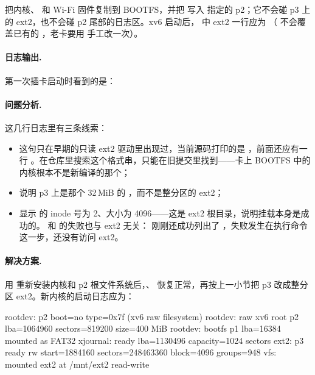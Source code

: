  把内核、 和 Wi-Fi 固件复制到 BOOTFS，并把  写入  指定的 p2；它不会碰 p3 上的 ext2，也不会碰 p2 尾部的日志区。xv6 启动后， 中 ext2 一行应为 （ 不会覆盖已有的 ，老卡要用  手工改一次）。

\paragraph{日志输出.} 第一次插卡启动时看到的是：


\paragraph{问题分析.} 这几行日志里有三条线索：

\begin{itemize}
  \item {} 这句只在早期的只读 ext2 驱动里出现过，当前源码打印的是 ，前面还应有一行 。在仓库里搜索这个格式串，只能在旧提交里找到——卡上 BOOTFS 中的内核根本不是新编译的那个；
  \item {} 说明 p3 上是那个 32\,MiB 的 ，而不是整分区的 ext2；
  \item {} 显示  的 inode 号为 2、大小为 4096——这是 ext2 根目录，说明挂载本身是成功的。 和  的失败也与 ext2 无关： 刚刚还成功列出了 ，失败发生在执行命令这一步，还没有访问 ext2。
\end{itemize}

\paragraph{解决方案.} 用  重新安装内核和 p2 根文件系统后，、 恢复正常，再按上一小节把 p3 改成整分区 ext2。新内核的启动日志应为：

\begin{txtcode}
rootdev: p2 boot=no type=0x7f (xv6 raw filesystem)
rootdev: raw xv6 root p2 lba=1064960 sectors=819200 size=400 MiB
rootdev: bootfs p1 lba=16384 mounted as FAT32
xjournal: ready lba=1130496 capacity=1024 sectors
ext2: p3 ready rw start=1884160 sectors=248463360 block=4096 groups=948
vfs: mounted ext2 at /mnt/ext2 read-write
\end{txtcode}

